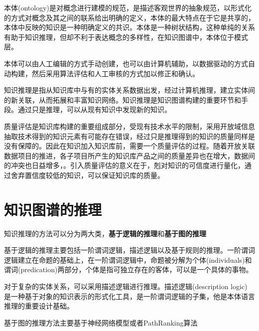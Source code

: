 \documentclass[11pt]{article}
\begin{document}
	本体(ontology)是对概念进行建模的规范，是描述客观世界的抽象规范，以形式化的方式对概念及其之间的联系给出明确的定义，本体的最大特点在于它是共享的，本体中反映的知识是一种明确定义的共识。本体是一种树状结构，这种单纯的关系有助于知识推理，但却不利于表达概念的多样性，在知识图谱中，本体位于模式层。
	
	本体可以由人工编辑的方式手动创建，也可以由计算机辅助，以数据驱动的方式自动构建，然后采用算法评估和人工审核的方式加以修正和确认。
	
	知识推理是指从知识库中与有的实体关系数据出发，经过计算机推理，建立实体间的新关联，从而拓展和丰富知识网络。知识推理是知识图谱构建的重要环节和手段。通过只是推理，可以从现有知识中发现新的知识。
	
	质量评估是知识库构建的重要组成部分，受现有技术水平的限制，采用开放域信息抽取技术得到的知识元素有可能存在错误，经过只是推理得到的知识的质量同样是没有保障的。因此在知识加入知识库前，需要一个质量评估的过程。随着开放关联数据项目的推进，各子项目所产生的知识库产品之间的质量差异也在增大，数据间的冲突也日益增多，。引入质量评估的意义在于，剋对知识的可信度进行量化，通过舍弃置信度较低的知识，可以保证知识库的质量。

	
	\section{知识图谱的推理}
	
	知识推理的方法可以分为两大类，\textbf{基于逻辑的推理}和\textbf{基于图的推理}
	
	基于逻辑的推理主要包括一阶谓词逻辑，描述逻辑以及基于规则的推理。一阶谓词逻辑建立在命题的基础上，在一阶谓词逻辑中，命题被分解为个体(individuals)和谓词(predication)两部分，个体是指可独立存在的客体，可以是一个具体的事物。
	
	对于复杂的实体关系，可以采用描述逻辑进行推理。描述逻辑(description logic) 是一种基于对象的知识表示的形式化工具，是一阶谓词逻辑的子集，他是本体语言推理的重要设计基础。
	
	基于图的推理方法主要基于神经网络模型或者PathRanking算法


	

		
\end{document}
